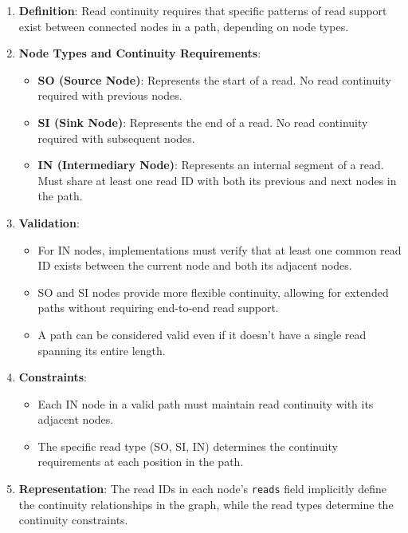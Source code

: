 \documentclass{article}
\begin{document}
\begin{enumerate}
	\item \textbf{Definition}: Read continuity requires that specific patterns of read support exist between connected nodes in a path, depending on node types.

	\item \textbf{Node Types and Continuity Requirements}:
	      \begin{itemize}
		      \item \textbf{SO (Source Node)}: Represents the start of a read. No read continuity required with previous nodes.
		      \item \textbf{SI (Sink Node)}: Represents the end of a read. No read continuity required with subsequent nodes.
		      \item \textbf{IN (Intermediary Node)}: Represents an internal segment of a read. Must share at least one read ID with both its previous and next nodes in the path.
	      \end{itemize}

	\item \textbf{Validation}:
	      \begin{itemize}
		      \item For IN nodes, implementations must verify that at least one common read ID exists between the current node and both its adjacent nodes.
		      \item SO and SI nodes provide more flexible continuity, allowing for extended paths without requiring end-to-end read support.
		      \item A path can be considered valid even if it doesn't have a single read spanning its entire length.
	      \end{itemize}

	\item \textbf{Constraints}:
	      \begin{itemize}
		      \item Each IN node in a valid path must maintain read continuity with its adjacent nodes.
		      \item The specific read type (SO, SI, IN) determines the continuity requirements at each position in the path.
	      \end{itemize}

	\item \textbf{Representation}: The read IDs in each node's \texttt{reads} field implicitly define the continuity relationships in the graph, while the read types determine the continuity constraints.
\end{enumerate}
\end{document}
